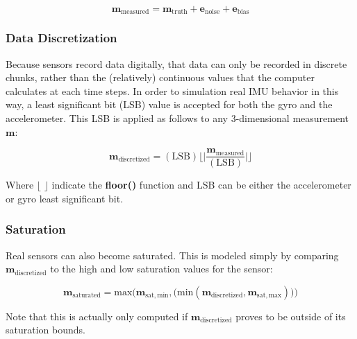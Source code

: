 \begin{equation}
\mathbf{m}_{\mathrm{measured}} = \mathbf{m}_{\mathrm{truth}} + \mathbf{e}_{\mathrm{noise}} + \mathbf{e}_{\mathrm{bias}}
\end{equation}


\subsubsection{Data Discretization}
Because sensors record data digitally, that data can only be recorded in discrete chunks, rather than the (relatively) continuous values that the computer calculates at each time steps. In order to simulation real IMU behavior in this way, a least significant bit (LSB) value is accepted for both the gyro and the accelerometer. This LSB is applied as follows to any 3-dimensional measurement $\mathbf{m}$:

\begin{equation}
\mathbf{m}_{\mathrm{discretized}} = (\mathrm{LSB})\Biggl\lfloor\Biggl|\frac{\mathbf{m}_{\mathrm{measured}}}{(\mathrm{LSB})}\Biggr|\Biggr\rfloor
\end{equation}

Where $\lfloor$  $\rfloor$ indicate the \textbf{floor()} function and LSB can be either the accelerometer or gyro least significant bit.

\subsubsection{Saturation}
Real sensors can also become saturated. This is modeled simply by comparing $\mathbf{m}_{\mathrm{discretized}}$ to the high and low saturation values for the sensor:

\begin{equation}
\mathbf{m}_{\mathrm{saturated}} = \mathrm{max}\Big(\mathbf{m}_{\mathrm{sat,min}},\big(\mathrm{min}(\mathbf{m}_{\mathrm{discretized}},\mathbf{m}_{\mathrm{sat,max}})\big)\Big)
\end{equation}

\noindent Note that this is actually only computed if $\mathbf{m}_{\mathrm{discretized}}$ proves to be outside of its saturation bounds.
